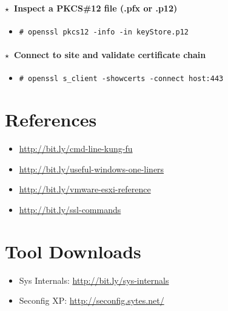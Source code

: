 \documentclass[10pt,landscape]{article}
\newcommand{\os}[1]{\texttt{\footnotesize{#1}}}
\newcommand{\unix}{\os{U}}
\newenvironment{action}[1]
  {\paragraph{$\star$~#1}\begin{itemize}[leftmargin=1cm]}
  {\end{itemize}}
\newcommand{\cmd}[2]{\item[#1] {\small\tt\# #2}}
\begin{document}
\begin{multicols*}{3}
\begin{action}{Inspect a PKCS\#12 file (.pfx or .p12)}
    \cmd{\unix}{openssl pkcs12 -info -in keyStore.p12}
\end{action}

\begin{action}{Connect to site and validate certificate chain}
    \cmd{\unix}{openssl s\_client -showcerts -connect host:443}
\end{action}

\section*{References}

\begin{itemize}
\small
\item \url{http://bit.ly/cmd-line-kung-fu}
\item \url{http://bit.ly/useful-windows-one-liners}
\item \url{http://bit.ly/vmware-esxi-reference}
\item \url{http://bit.ly/ssl-commands}
\end{itemize}

\section*{Tool Downloads}

\begin{itemize}
\small
\item Sys Internals: \url{http://bit.ly/sys-internals}
\item Seconfig XP: \url{http://seconfig.sytes.net/}
\end{itemize}
\end{multicols*}
\end{document}
